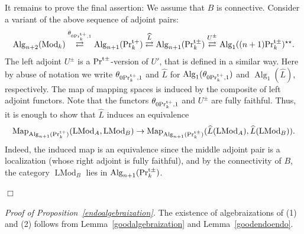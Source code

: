 \documentclass[leqno,12pt]{amsart}
\theoremstyle{plain}
\theoremstyle{definition}
\newcommand{\PRTT}{\textup{Pr}^{\textup{t}+}}
\newcommand{\PRTTT}{\textup{Pr}^{\textup{t}\pm}}
\newcommand{\Mod}{\operatorname{Mod}}
\newcommand{\Map}{\operatorname{Map}}
\newcommand{\Alg}{\operatorname{Alg}}
\newcommand{\LMod}{\operatorname{LMod}}
\newcommand{\QED}{{\unskip\nobreak\hfil\penalty50\quad\null\nobreak\hfil
{$\Box$}\parfillskip0pt\finalhyphendemerits0\par\medskip}}
\begin{document}
It remains to prove the final assertion: We assume that
$B$ is connective.
Consider a variant of the above sequence of adjoint pairs:
\[
\Alg_{n+2}(\Mod_k)\stackrel{\theta_{0\PRTT_k,1}}{\rightleftarrows}   \Alg_{n+1}(\PRTT_k) \stackrel{\widehat{L}}{\rightleftarrows}\Alg_{n+1}(\PRTTT_k) \stackrel{U^{\pm}}{\rightleftarrows} \Alg_1((n+1)\PRTTT_k)^{\star \star}.
\]
The left adjoint $U^{\pm}$ is a $\PRTTT$-version of $U'$, that is defined in a similar way. 
Here by abuse of notation we write $\theta_{0\PRTT_k,1}$ and $\widehat{L}$ for $\Alg_1(\theta_{0\PRTT_k,1})$ and $\Alg_1(\widehat{L})$, respectively.
The map of mapping spaces is induced by the composite of left adjoint functors.
Note that the functors $\theta_{0\PRTT_k,1}$ and $U^{\pm}$ are fully faithful.
Thus, it is enough to show that 
$\widehat{L}$ induces an equivalence
\[
\Map_{\Alg_{n+1}(\PRTT_k)}(\LMod_A,\LMod_B)\to \Map_{\Alg_{n+1}(\PRTTT_k)}(\widehat{L}(\LMod_A),\widehat{L}(\LMod_B)).
\]
Indeed, the induced map is an equivalence since the middle adjoint pair is a localization
(whose right adjoint is fully faithful), and by the connectivity of $B$, the category $\LMod_B$ lies in $\Alg_{n+1}(\PRTTT_k)$.
\QED









{\it Proof of Proposition~\ref{endoalgebraization}.}
The existence of algebraizations of (1) and (2) follows from Lemma~\ref{goodalgebraization} and Lemma~\ref{goodendoendo}.
\end{document}
